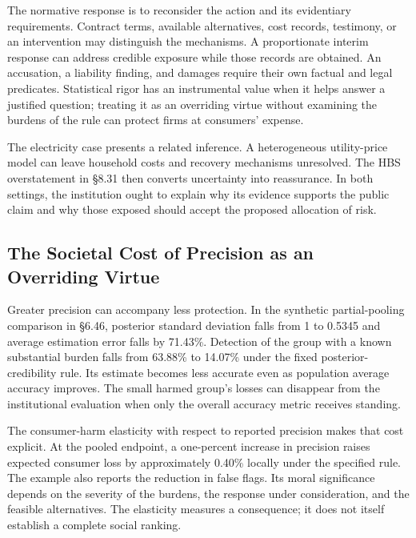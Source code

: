 The normative response is to reconsider the action and its evidentiary
requirements. Contract terms, available alternatives, cost records,
testimony, or an intervention may distinguish the mechanisms. A
proportionate interim response can address credible exposure while those
records are obtained. An accusation, a liability finding, and damages
require their own factual and legal predicates. Statistical rigor has an
instrumental value when it helps answer a justified question; treating
it as an overriding virtue without examining the burdens of the rule can
protect firms at consumers' expense.

The electricity case presents a related inference. A heterogeneous
utility-price model can leave household costs and recovery mechanisms
unresolved. The HBS overstatement in §8.31 then converts uncertainty
into reassurance. In both settings, the institution ought to explain why
its evidence supports the public claim and why those exposed should
accept the proposed allocation of risk.

\hypertarget{M09-the-societal-cost-of-precision-as-an-overriding-virtue}{%
\subsection{The Societal Cost of Precision as an Overriding
Virtue}\label{M09-the-societal-cost-of-precision-as-an-overriding-virtue}}

\noindent \noindent Greater precision can accompany less protection. In the
synthetic partial-pooling comparison in §6.46, posterior standard
deviation falls from 1 to 0.5345 and average estimation error falls by
71.43\%. Detection of the group with a known substantial burden falls
from 63.88\% to 14.07\% under the fixed posterior-credibility rule. Its
estimate becomes less accurate even as population average accuracy
improves. The small harmed group's losses can disappear from the
institutional evaluation when only the overall accuracy metric receives
standing.

The consumer-harm elasticity with respect to reported precision makes
that cost explicit. At the pooled endpoint, a one-percent increase in
precision raises expected consumer loss by approximately 0.40\% locally
under the specified rule. The example also reports the reduction in
false flags. Its moral significance depends on the severity of the
burdens, the response under consideration, and the feasible
alternatives. The elasticity measures a consequence; it does not itself
establish a complete social ranking.

